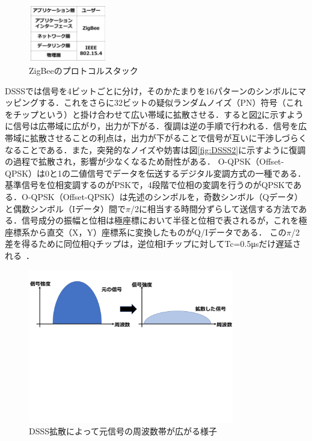 \begin{figure}[H]
  \centering
  \includegraphics[width=0.3\textwidth]{figures/prostack.pdf}
  \caption{ZigBeeのプロトコルスタック}
  \label{fig:stack}
\end{figure}


DSSSでは信号を4ビットごとに分け，そのかたまりを16パターンのシンボルにマッピングする．これをさらに32ビットの疑似ランダムノイズ（PN）符号（これをチップという）と掛け合わせて広い帯域に拡散させる．すると図\ref{fig:DSSS1}に示すように信号は広帯域に広がり，出力が下がる．復調は逆の手順で行われる．信号を広帯域に拡散させることの利点は，出力が下がることで信号が互いに干渉しづらくなることである．また，突発的なノイズや妨害は図\ref{fig:DSSS2}に示すように復調の過程で拡散され，影響が少なくなるため耐性がある．
O-QPSK（Offset-QPSK）は0と1の二値信号でデータを伝送するデジタル変調方式の一種である．基準信号を位相変調するのがPSKで，4段階で位相の変調を行うのがQPSKである．O-QPSK（Offset-QPSK）は先述のシンボルを，奇数シンボル（Qデータ）と偶数シンボル（Iデータ）間で$\pi$/2に相当する時間分ずらして送信する方法である．信号成分の振幅と位相は極座標において半径と位相で表されるが，これを極座標系から直交（X，Y）座標系に変換したものがQ/Iデータである．
この$\pi$/2差を得るために同位相Qチップは，逆位相Iチップに対してTc=0.5\si{\micro\second}だけ遅延される~\cite{Effi}．

\begin{figure}[H]
  \centering
  \includegraphics[width=0.8\textwidth]{figures/6.pdf}
    \vspace{-40mm}
  \caption{DSSS拡散によって元信号の周波数帯が広がる様子}
  \label{fig:DSSS1}
\end{figure}

